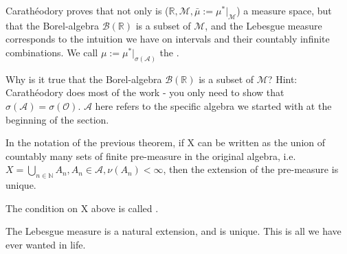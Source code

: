 \documentclass[11pt]{scrartcl}
\begin{document}
\begin{example}
Carath\'eodory proves that not only is ($\mathbb{R},\mathcal{M},\bar{\mu}:=\mu^*|_\mathcal{M} $) a measure space, but that the Borel-algebra $\mathcal{B}(\mathbb{R})$ is a subset of $\mathcal{M}$, and the Lebesgue measure corresponds to the intuition we have on intervals and their countably infinite combinations. We call $\mu := \mu^*|_{\sigma(\mathcal{A})}$ the .
\end{example}

\begin{exercise}
Why is it true that the Borel-algebra $\mathcal{B}(\mathbb{R})$ is a subset of $\mathcal{M}$? Hint: Carath\'eodory does most of the work - you only need to show that $\sigma(\mathcal{A}) = \sigma(\mathcal{O})$. $\mathcal{A}$ here refers to the specific algebra we started with at the beginning of the section.
\end{exercise}

\begin{theorem} In the notation of the previous theorem, if X can be written as the  union of countably many sets of finite pre-measure in the original algebra, i.e. $X = \bigcup_{n\in \mathbb{N}} A_n, A_n \in \mathcal{A}, \nu(A_n) < \infty $, then the extension of the pre-measure is unique.
\end{theorem}

\begin{remark}
The condition on X above is called .
\end{remark}

\begin{example}
The Lebesgue measure is a natural extension, and is unique. This is all we have ever wanted in life.
\end{example}
\end{document}

